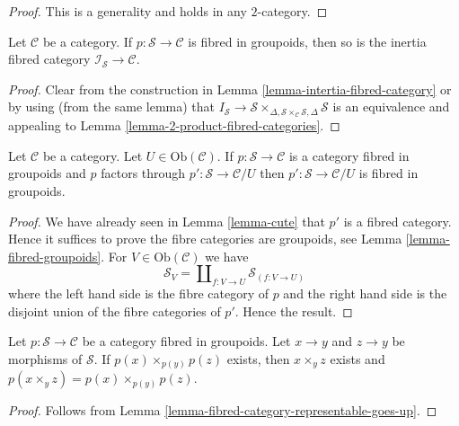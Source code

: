 \begin{proof}
This is a generality and holds in any $2$-category.
\end{proof}

\begin{lemma}
\label{lemma-inertia-fibred-groupoids}
Let $\mathcal{C}$ be a category.
If $p : \mathcal{S} \to \mathcal{C}$ is fibred in groupoids, then
so is the inertia fibred category $\mathcal{I}_\mathcal{S} \to \mathcal{C}$.
\end{lemma}

\begin{proof}
Clear from the construction in
Lemma \ref{lemma-intertia-fibred-category}
or by using (from the same lemma) that
$I_\mathcal{S} \to \mathcal{S}
\times_{\Delta,\mathcal{S}\times_\mathcal{C} \mathcal{S}, \Delta}\mathcal{S}$
is an equivalence and appealing to
Lemma \ref{lemma-2-product-fibred-categories}.
\end{proof}

\begin{lemma}
\label{lemma-cute-groupoids}
Let $\mathcal{C}$ be a category. Let $U \in \text{Ob}(\mathcal{C})$.
If $p : \mathcal{S} \to \mathcal{C}$ is a category fibred in groupoids
and $p$ factors through $p' : \mathcal{S} \to \mathcal{C}/U$
then $p' : \mathcal{S} \to \mathcal{C}/U$ is fibred in groupoids.
\end{lemma}

\begin{proof}
We have already seen in Lemma \ref{lemma-cute} that $p'$ is a fibred
category. Hence it suffices to prove the fibre categories are groupoids,
see Lemma \ref{lemma-fibred-groupoids}.
For $V \in \text{Ob}(\mathcal{C})$ we have
$$
\mathcal{S}_V = \coprod\nolimits_{f : V \to U} \mathcal{S}_{(f : V \to U)}
$$
where the left hand side is the fibre category of $p$ and the right hand side
is the disjoint union of the fibre categories of $p'$.
Hence the result.
\end{proof}

\begin{lemma}
\label{lemma-fibred-groupoids-fibre-product-goes-up}
Let $p : \mathcal{S} \to \mathcal{C}$ be a category fibred in groupoids.
Let $x \to y$ and $z \to y$ be morphisms of $\mathcal{S}$.
If $p(x) \times_{p(y)} p(z)$ exists, then
$x \times_y z$ exists and $p(x \times_y z) = p(x) \times_{p(y)} p(z)$.
\end{lemma}

\begin{proof}
Follows from
Lemma \ref{lemma-fibred-category-representable-goes-up}.
\end{proof}

